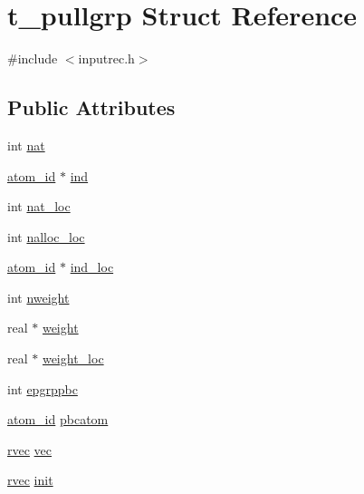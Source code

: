 \hypertarget{structt__pullgrp}{\section{t\-\_\-pullgrp \-Struct \-Reference}
\label{structt__pullgrp}
}


{\ttfamily \#include $<$inputrec.\-h$>$}

\subsection*{\-Public \-Attributes}
\begin{DoxyCompactItemize}
\item 
int \hyperlink{structt__pullgrp_aa5e864c7b42e15803087b76bf18329a6}{nat}
\item 
\hyperlink{include_2types_2simple_8h_ad3f47cdb48677e516e2049719612c737}{atom\-\_\-id} $\ast$ \hyperlink{structt__pullgrp_a729df7f2f18f169e6ce9315188f6efbb}{ind}
\item 
int \hyperlink{structt__pullgrp_a5ed2333d65e0fc0f2f28de3a209d9127}{nat\-\_\-loc}
\item 
int \hyperlink{structt__pullgrp_a74777c2731a9a238fa5b6566563ea282}{nalloc\-\_\-loc}
\item 
\hyperlink{include_2types_2simple_8h_ad3f47cdb48677e516e2049719612c737}{atom\-\_\-id} $\ast$ \hyperlink{structt__pullgrp_ac2dee56f80fa8bc23104f8e535be1210}{ind\-\_\-loc}
\item 
int \hyperlink{structt__pullgrp_af4252ffabf681a484b80a7cf6b2fa410}{nweight}
\item 
real $\ast$ \hyperlink{structt__pullgrp_a8ac8ef990664637ad9b3c2136fa4be33}{weight}
\item 
real $\ast$ \hyperlink{structt__pullgrp_a2c0438fc7f0bcf6b4b41c5a9ad902178}{weight\-\_\-loc}
\item 
int \hyperlink{structt__pullgrp_a1e3d498d59eb25dbcf47c894c496e344}{epgrppbc}
\item 
\hyperlink{include_2types_2simple_8h_ad3f47cdb48677e516e2049719612c737}{atom\-\_\-id} \hyperlink{structt__pullgrp_ad6adbd83a0b5f4227496ef09d8c99f3f}{pbcatom}
\item 
\hyperlink{share_2template_2gromacs_2types_2simple_8h_aa02a552a4abd2f180c282a083dc3a999}{rvec} \hyperlink{structt__pullgrp_a984b9fbe5a1128161eb65f16bd5e6f44}{vec}
\item 
\hyperlink{share_2template_2gromacs_2types_2simple_8h_aa02a552a4abd2f180c282a083dc3a999}{rvec} \hyperlink{structt__pullgrp_a56dd2a59caa9bdca704f48a1e00f7101}{init}

\end{DoxyCompactItemize}
